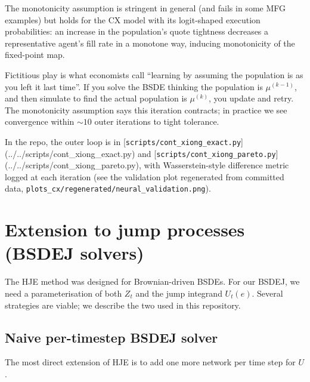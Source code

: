 The monotonicity assumption is stringent in general (and fails in some MFG examples) but holds for the CX model with its logit-shaped execution probabilities: an increase in the population's quote tightness decreases a representative agent's fill rate in a monotone way, inducing monotonicity of the fixed-point map.

\begin{intuition}
Fictitious play is what economists call ``learning by assuming the population is as you left it last time''. If you solve the BSDE thinking the population is $\mu^{(k-1)}$, and then simulate to find the actual population is $\mu^{(k)}$, you update and retry. The monotonicity assumption says this iteration contracts; in practice we see convergence within $\sim 10$ outer iterations to tight tolerance.

In the repo, the outer loop is in [\texttt{scripts/cont\_xiong\_exact.py}](../../scripts/cont_xiong_exact.py) and [\texttt{scripts/cont\_xiong\_pareto.py}](../../scripts/cont_xiong_pareto.py), with Wasserstein-style difference metric logged at each iteration (see the validation plot regenerated from committed data, \texttt{plots\_cx/regenerated/neural\_validation.png}).
\end{intuition}

\section{Extension to jump processes (BSDEJ solvers)}
\label{sec:bsdej-solver}

The HJE method was designed for Brownian-driven BSDEs. For our BSDEJ, we need a parameterisation of both $Z_t$ and the jump integrand $U_t(e)$. Several strategies are viable; we describe the two used in this repository.

\subsection{Naive per-timestep BSDEJ solver}

The most direct extension of HJE is to add one more network per time step for $U$.

